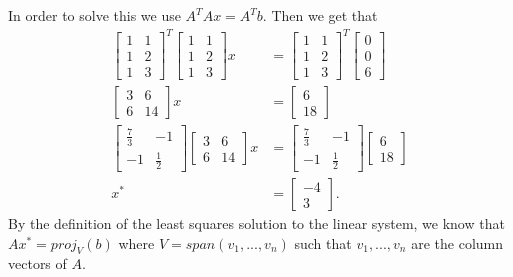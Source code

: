 \documentclass{article}
\begin{document}
\begin{enumerate}
    In order to solve this we use $A^TAx=A^Tb$. Then we get that 
    \begin{align*}
        \begin{bmatrix}
            1 & 1\\
            1 & 2\\
            1 & 3
        \end{bmatrix}^T
        \begin{bmatrix}
            1 & 1\\
            1 & 2\\
            1 & 3
        \end{bmatrix}x &= \begin{bmatrix}
            1 & 1\\
            1 & 2\\
            1 & 3
        \end{bmatrix}^T\begin{bmatrix}
            0\\
            0\\
            6
        \end{bmatrix}\\
        \begin{bmatrix}
            3 & 6\\
            6 & 14
        \end{bmatrix}x &= \begin{bmatrix}
            6\\
            18
        \end{bmatrix}\\
        \begin{bmatrix}
            \frac{7}{3} & -1\\
            -1 & \frac{1}{2}
        \end{bmatrix}
        \begin{bmatrix}
            3 & 6\\
            6 & 14
        \end{bmatrix}x &= 
        \begin{bmatrix}
            \frac{7}{3} & -1\\
            -1 & \frac{1}{2}
        \end{bmatrix}
        \begin{bmatrix}
            6\\
            18
        \end{bmatrix}\\
        x^* &= \begin{bmatrix}
            -4\\
            3
        \end{bmatrix}.
    \end{align*} By the definition of the least squares solution to the linear system, we know that $Ax^* = proj_V(b)$ where $V = span(v_1,...,v_n)$ such that $v_1,...,v_n$ are the column vectors of $A.$
    

\end{enumerate}
\end{document}
